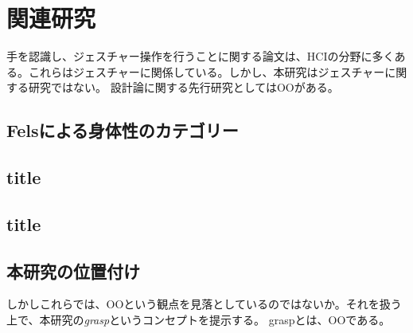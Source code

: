 \chapter{関連研究}
手を認識し、ジェスチャー操作を行うことに関する論文は、HCIの分野に多くある。これらはジェスチャーに関係している。しかし、本研究はジェスチャーに関する研究ではない。
設計論に関する先行研究としてはOOがある。

\section{Felsによる身体性のカテゴリー}
\section{title}
\section{title}
\section{本研究の位置付け}
しかしこれらでは、OOという観点を見落としているのではないか。それを扱う上で、本研究の\textit{grasp}というコンセプトを提示する。
graspとは、OOである。